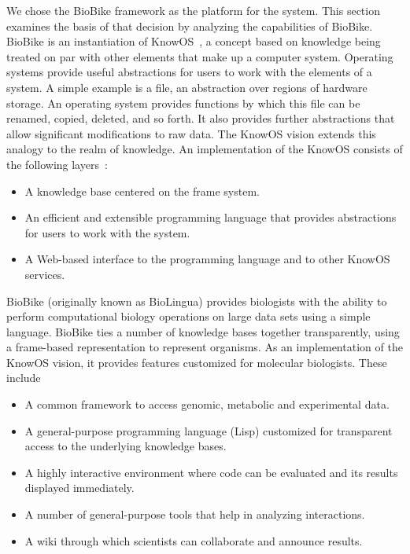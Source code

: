 We chose the BioBike framework as the platform for the system. This
section examines the basis of that decision by analyzing the
capabilities of BioBike.  BioBike is an instantiation of
KnowOS~\cite{oai:CiteSeerXPSU:10.1.1.75.7132}, a concept based on
knowledge being treated on par with other elements that make up a
computer system.  Operating systems provide useful abstractions for
users to work with the elements of a system.  A simple example is a
file, an abstraction over regions of hardware storage.  An operating
system provides functions by which this file can be renamed, copied,
deleted, and so forth. It also provides further abstractions that
allow significant modifications to raw data. The KnowOS vision extends
this analogy to the realm of knowledge. An implementation of the
KnowOS consists of the following
layers~\cite{oai:CiteSeerXPSU:10.1.1.75.7132}:


\begin{itemize}
\item A knowledge base centered on the frame system.
\item An efficient and extensible programming language that provides
  abstractions for users to work with the system.
\item A Web-based interface to the programming language and to other
  KnowOS services.
\end{itemize}

BioBike (originally known as BioLingua) provides biologists with the
ability to perform computational biology operations on large data sets
using a simple language. BioBike ties a number of knowledge bases
together transparently, using a frame-based representation to
represent organisms. As an implementation of the KnowOS vision, it
provides features customized for molecular biologists. These
include~\cite{journals/bioinformatics/MassarTES05}

\begin{itemize}
\item A common framework to access genomic, metabolic and experimental data.
\item A general-purpose programming language (Lisp) customized for
  transparent access to the underlying knowledge bases.
\item A highly interactive environment where code can be evaluated and
  its results displayed immediately.
\item A number of general-purpose tools that help in analyzing interactions.
\item A wiki through which scientists can collaborate and announce results.
\end{itemize}


